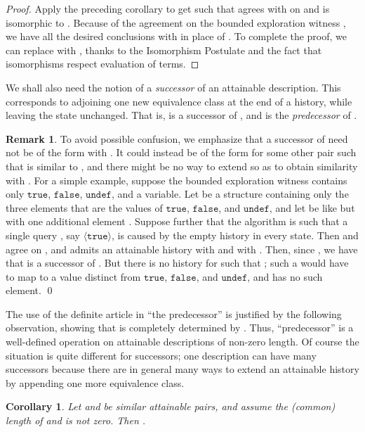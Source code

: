 \documentclass{LMCS}
\newtheorem{coro}[thm]{Corollary}
\theoremstyle{definition}
\newtheorem{rmk}[thm]{Remark}
\newcommand{\sq}[1]{\ensuremath{\langle#1\rangle}}
\newcommand{\ttt}[1]{\ensuremath{\mathtt {#1}}}
\begin{document}
\begin{proof}
Apply the preceding corollary to get  such that 
agrees with  on  and is isomorphic to .
Because of the agreement on the bounded exploration witness ,
we have all the desired conclusions with  in place of
.  To complete the proof, we can replace  with
, thanks to the Isomorphism Postulate and the fact that
isomorphisms respect evaluation of terms.
\end{proof}

We shall also need the notion of a \emph{successor} of an attainable
description.  This corresponds to adjoining one new equivalence class
at the end of a history, while leaving the state unchanged. That is,
 is a successor of , and
 is the \emph{predecessor} of .

\begin{rmk}
To avoid possible confusion, we emphasize that a successor of
 need not be of the form  with
.  It could instead be of the form  for some
other pair  such that  is similar to ,
and there might be no way to extend  so as to obtain similarity
with .  For a simple example, suppose the bounded exploration
witness  contains only \ttt{true}, \ttt{false}, \ttt{undef}, and a
variable.  Let  be a structure containing only the three elements
that are the values of \ttt{true}, \ttt{false}, and \ttt{undef}, and
let  be like  but with one additional element .  Suppose
further that the algorithm is such that a single query , say
\sq{\ttt{true}}, is caused by the empty history  in every state.
Then  and  agree on , and  admits an
attainable history  with  and with
.  Then, since , we have that 
is a successor of .  But there is no
history  for  such that ; such
a  would have to map  to a value distinct from \ttt{true},
\ttt{false}, and \ttt{undef}, and  has no such element.
\qed\end{rmk}

The use of the definite article in ``the predecessor'' is justified by
the following observation, showing that  is completely
determined by .  Thus, ``predecessor'' is a
well-defined operation on attainable descriptions of non-zero length.
Of course the situation is quite different for successors; one
description can have many successors because there are in general many
ways to extend an attainable history by appending one more equivalence
class.

\begin{coro}
  Let  and  be similar attainable pairs,
  and assume the (common) length of  and  is
  not zero.  Then .
\end{coro}
\end{document}
